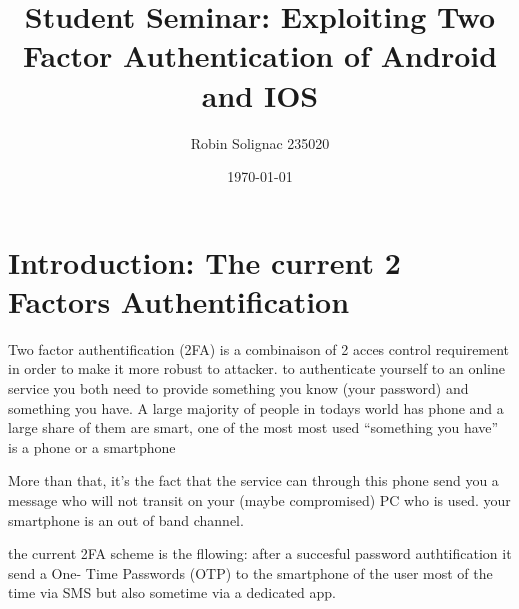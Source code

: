 \documentclass[11pt,conference,compsocconf]{IEEEtran}
\title{Student Seminar: Exploiting Two Factor Authentication of Android and IOS}
\author{Robin Solignac 235020}
\date{\today}
\begin{document}
\maketitle
\begin{comment}
\begin{abstract}
Applications  which  can  be  used  in  different  platforms  now  use  two
factor authentication (2FA) to allow users to conveniently switch from one platform to another.
For example, when a user tries to login his gmail, it is not enough to enter correct password 
(first factor), it is also necessary to enter a PIN which is received by an SMS (second factor).
The aim of this project explaining the attacks against 2FA in IOS and Android devices and 
what can be the solutions. 
\end{abstract}
\end{comment}

\section{Introduction: The current 2 Factors Authentification}

Two factor authentification (2FA) is a combinaison of 2 acces control requirement in 
order to make it more robust to attacker. to authenticate yourself to an online 
service you both need to provide something you know (your password) and 
something you have. 
A large majority of people in todays world has phone and a large share of 
them are smart, one of the most most used ``something you have''  is a phone or 
a smartphone

More than that, it's the fact that the service can through this phone
send you a message  who will not transit on your (maybe compromised) PC 
who is used. your smartphone is an out of band channel.

\begin{comment} But it's not the only fact of having a phone or a phonenumber who is 
used in pratice to authenticate but the fact that services can send message to it and that that 
user can get it without using the main (maybe compromised) communication 
channel. This is called an . 
\end{comment} 

the current 2FA scheme is the fllowing: after a succesful password authtification it send a One-
Time Passwords (OTP) to the smartphone of the user most of the time via SMS 
but also sometime via a dedicated app.

\end{document}
